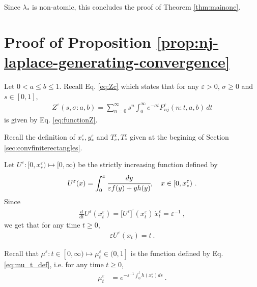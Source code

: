 \documentclass[reqno, 12pt, a4paper]{amsart}
\theoremstyle{plain}
\theoremstyle{definition}
\begin{document}
Since $\lambda_*$ is non-atomic, this concludes the proof of  Theorem \ref{thm:mainone}.



\section{Proof of Proposition \ref{prop:nj-laplace-generating-convergence}}
\label{sec:nj-laplace-generating-convergence}

Let $0 <a \le b \le 1$. Recall Eq. \eqref{eq:Zc} which states that for any $\varepsilon>0$,  $\sigma \ge 0$ and $s \in[0,1]$,
\begin{equation}
\begin{split}
Z^\varepsilon(s,\sigma: a,b)=\sum_{n=0}^\infty s^n \int_{0}^\infty e^{-\sigma t} {P}^\varepsilon_{nj}(n:t,a,b)\, dt 
\end{split}
\end{equation}
is given by Eq. \eqref{eq:functionZ}.




\bigskip


Recall the definition of $x_*^\varepsilon, y_*^\varepsilon$ and $T_c^\varepsilon, T_*^\varepsilon$ given at the begining of Section \ref{sec:convfiniterectangles}.

\bigskip 


Let $U^\varepsilon:[0,x^\varepsilon_*) \mapsto [0,\infty)$ be the strictly increasing function defined by
\begin{equation}
\label{eq:Uepsilon}
\begin{split}
U^\varepsilon (x) = \int_{0}^x \cfrac{dy}{\varepsilon f(y) + y h(y)}, \quad x\in [0,x^\varepsilon_*) \ .
\end{split}
\end{equation} 
Since
\begin{equation}
\begin{split}
\frac{d}{dt} U^\varepsilon (x^\varepsilon_t) = \big[U^\varepsilon\big]^{\prime} (x^\varepsilon_t) \, {\dot x}^\varepsilon_t = \varepsilon^{-1} \ ,
\end{split}
\end{equation}
we get that for any time $t\ge 0$, 
\begin{equation}
\label{eq:eq-sol-x}
\begin{split}
\varepsilon U^\varepsilon (x_t) = t \ . 
\end{split}
\end{equation}

Recall that $\mu^\varepsilon: t \in [0,\infty) \mapsto \mu_t^\varepsilon \in (0, 1]$ is the function defined by Eq. \eqref{eq:mu_t_def}, i.e. for any time $t\ge 0$,
\begin{equation}
\label{eq:mu}
\begin{split}
\mu_t^\varepsilon &= e^{- \varepsilon^{-1} \int_0^t  h(x^\varepsilon_s)ds} \ .
\end{split}
\end{equation}
\end{document}

